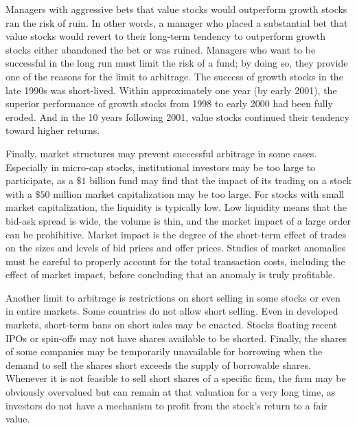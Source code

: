 \documentclass[11pt]{article}
\begin{document}
Managers with aggressive bets that value stocks would outperform growth stocks ran the risk of ruin. In other words, a manager who placed a substantial bet that value stocks would revert to their long-term tendency to outperform growth stocks either abandoned the bet or was ruined. Managers who want to be successful in the long run must limit the risk of a fund; by doing so, they provide one of the reasons for the limit to arbitrage. The success of growth stocks in the late 1990s was short-lived. Within approximately one year (by early 2001), the superior performance of growth stocks from 1998 to early 2000 had been fully eroded. And in the 10 years following 2001, value stocks continued their tendency toward higher returns.

Finally, market structures may prevent successful arbitrage in some cases. Especially in micro-cap stocks, institutional investors may be too large to participate, as a $\$ 1$ billion fund may find that the impact of its trading on a stock with a $\$ 50$ million market capitalization may be too large. For stocks with small market capitalization, the liquidity is typically low. Low liquidity means that the bid-ask spread is wide, the volume is thin, and the market impact of a large order can be prohibitive. Market impact is the degree of the short-term effect of trades on the sizes and levels of bid prices and offer prices. Studies of market anomalies must be careful to properly account for the total transaction costs, including the effect of market impact, before concluding that an anomaly is truly profitable.

Another limit to arbitrage is restrictions on short selling in some stocks or even in entire markets. Some countries do not allow short selling. Even in developed markets, short-term bans on short sales may be enacted. Stocks floating recent IPOs or spin-offs may not have shares available to be shorted. Finally, the shares of some companies may be temporarily unavailable for borrowing when the demand to sell the shares short exceeds the supply of borrowable shares. Whenever it is not feasible to sell short shares of a specific firm, the firm may be obviously overvalued but can remain at that valuation for a very long time, as investors do not have a mechanism to profit from the stock's return to a fair value.
\end{document}
